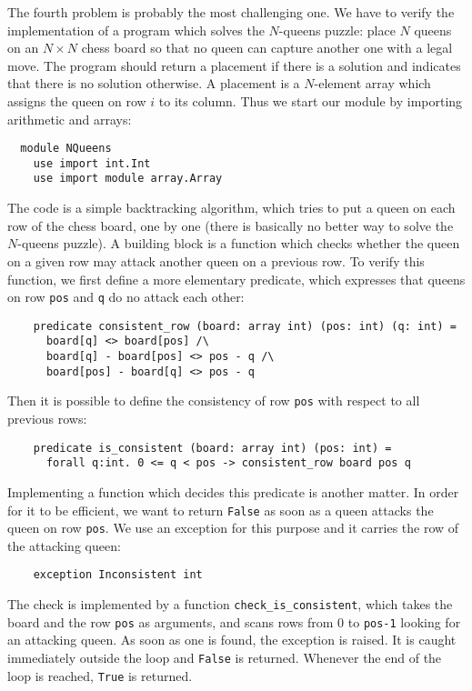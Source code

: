 The fourth problem is probably the most challenging one.
We have to verify the implementation of a program which solves the
$N$-queens puzzle: place $N$ queens on an $N \times N$
chess board so that no queen can capture another one with a
legal move.
The program should return a placement if there is a solution and
indicates that there is no solution otherwise. A placement is a
$N$-element array which assigns the queen on row $i$ to its column.
Thus we start our module by importing arithmetic and arrays:
\begin{verbatim}
  module NQueens
    use import int.Int
    use import module array.Array
\end{verbatim}
The code is a simple backtracking algorithm, which tries to put a queen
on each row of the chess board, one by one (there is basically no
better way to solve the $N$-queens puzzle).
A building block is a function which checks whether the queen on a
given row may attack another queen on a previous row. To verify this
function, we first define a more elementary predicate, which expresses
that queens on row \texttt{pos} and \texttt{q} do no attack each other:
\begin{verbatim}
    predicate consistent_row (board: array int) (pos: int) (q: int) =
      board[q] <> board[pos] /\
      board[q] - board[pos] <> pos - q /\
      board[pos] - board[q] <> pos - q
\end{verbatim}
Then it is possible to define the consistency of row \texttt{pos}
with respect to all previous rows:
\begin{verbatim}
    predicate is_consistent (board: array int) (pos: int) =
      forall q:int. 0 <= q < pos -> consistent_row board pos q
\end{verbatim}
Implementing a function which decides this predicate is another
matter. In order for it to be efficient, we want to return
\texttt{False} as soon as a queen attacks the queen on row
\texttt{pos}. We use an exception for this purpose and it carries the
row of the attacking queen:
\begin{verbatim}
    exception Inconsistent int
\end{verbatim}
The check is implemented by a function \verb|check_is_consistent|,
which takes the board and the row \texttt{pos} as arguments, and scans
rows from 0 to \texttt{pos-1} looking for an attacking queen. As soon
as one is found, the exception is raised. It is caught immediately
outside the loop and \texttt{False} is returned. Whenever the end of
the loop is reached, \texttt{True} is returned.

